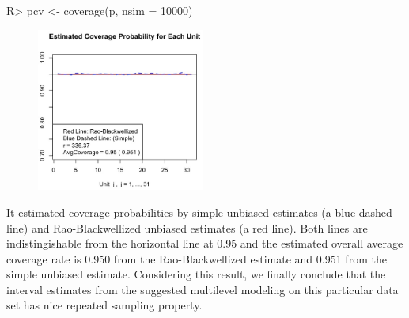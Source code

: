 \documentclass[article]{jss}
\begin{document}
\begin{CodeChunk}
\begin{CodeInput}
R> pcv <- coverage(p, nsim = 10000)
\end{CodeInput}
\end{CodeChunk}
\begin{figure}[h]
\begin{center}
\includegraphics[width = 5.5cm]{hospital2.png}
\end{center}
\end{figure}

It estimated coverage probabilities by simple unbiased estimates (a blue dashed line) and Rao-Blackwellized unbiased estimates (a red line). Both lines are indistingishable from the horizontal line at 0.95 and the estimated overall average coverage rate is 0.950 from the Rao-Blackwellized estimate and 0.951 from the simple unbiased estimate. Considering this result, we finally conclude that the interval estimates from the suggested multilevel modeling on this particular data set has nice repeated sampling property.
\\


\end{document}
